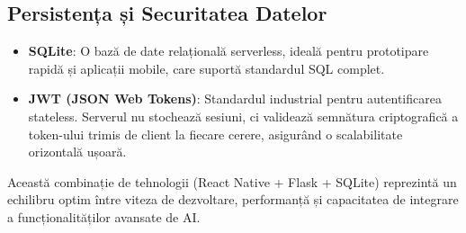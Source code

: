 \subsection{Persistența și Securitatea Datelor}
\begin{itemize}
    \item \textbf{SQLite}: O bază de date relațională serverless, ideală pentru prototipare rapidă și aplicații mobile, care suportă standardul SQL complet.
    \item \textbf{JWT (JSON Web Tokens)}: Standardul industrial pentru autentificarea stateless. Serverul nu stochează sesiuni, ci validează semnătura criptografică a token-ului trimis de client la fiecare cerere, asigurând o scalabilitate orizontală ușoară.
\end{itemize}

Această combinație de tehnologii (React Native + Flask + SQLite) reprezintă un echilibru optim între viteza de dezvoltare, performanță și capacitatea de integrare a funcționalităților avansate de AI.

